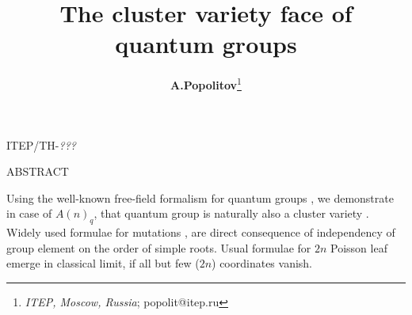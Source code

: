 \documentclass{article}
\title{{\bf The cluster variety face of quantum groups} \vspace{.2cm}}
\author{{\bf A.Popolitov}\thanks{{\small
{\it ITEP, Moscow, Russia}}; popolit@itep.ru}}
\newcommand {\?}{\textit{???}}
\newcommand{\YAMLSectionize}[1]{}
\begin{document}
 \maketitle

\vspace{-5.0cm}

\begin{center}
\hfill ITEP/TH-\?\\
\end{center}

\vspace{3.5cm}

\centerline{ABSTRACT}

\bigskip

{\footnotesize
Using the well-known free-field formalism for quantum groups \cite{MV1}, we demonstrate
in case of $A(n)_q$, that quantum group is naturally also a cluster variety \cite{FG1}.
Widely used \cite{Hik1} formulae for mutations \cite{FG1},\cite{FG2} are
direct consequence of independency of group element on the order of simple roots.
Usual formulae \cite{Mars1} for $2 n$ Poisson leaf emerge in classical limit,
if all but few ($2n$) coordinates vanish.
}


\tableofcontents

\YAMLSectionize{
# The sketch and logic of the presentation
- Introduction :
  - first a blah-blah-blah on how quantum groups are great and important objects,
    and cluster varieties - even more important
  - convenient MV parametrization of group element and commutational relations
  - convenient MFG parametrization of group element
  - mutations
- Body :
  - Details :
    commutational relations for dual algebra from comultiplication :
      - brief overview of original Morozov-Vinet
      - (done) derivation for sl(2)
      - (wontfix) derivation for sl(3)
      - (done) derivation for sl(n)
    connection between multicartan and Gauss parametrization
      - (done) sl(2) fundamental
      - (done) sl(n)
    commutational relations for multicartan parametrization
      - (wontfix) sl(2)
      - (wontfix) sl(n)
    mutations
      - (done) sl(2) fundamental
      - sl(n) fundamental reduces to sl(2)
      - sl(2) first symmetrical
- Conclusion
}

\bigskip

\bigskip

\end{document}
